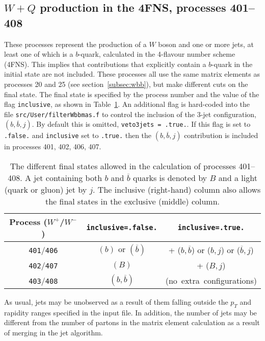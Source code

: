 \documentclass[12pt]{article}
\begin{document}
\subsection{$W+Q$ production in the 4FNS, processes 401--408}
\label{subsec:wbbfilter}
These processes represent the production of a $W$ boson and one or more jets,
at least one of which is a $b$-quark, calculated in the 4-flavour number scheme (4FNS). 
This implies that contributions that explicitly contain a $b$-quark in the initial state
are not included.
These processes all use the same matrix
elements as processes 20 and 25 (see section~\ref{subsec:wbb}), but make different
cuts on the final state. The final state is specified by the process number and
the value of the flag {\tt inclusive}, as shown in Table~\ref{table:wbbfilter}.
An additional flag is hard-coded into the file {\tt src/User/filterWbbmas.f} to control
the inclusion of the 3-jet configuration, $(b,\overline b,j)$. By default this is
omitted, {\tt veto3jets = .true.}. If this flag is set to {\tt .false.} and
{\tt inclusive} set to {\tt .true.} then the $(b,\overline b,j)$ contribution
is included in processes 401, 402, 406, 407.

\begin{table}
\begin{center}
\begin{tabular}{|c|c|c|} \hline
 Process ($W^+$/$W^-$) & {\tt inclusive=.false.} & {\tt inclusive=.true.} \\
\hline
{\tt 401}/{\tt 406} & $(b)$ or $(\overline b)$ & + ($b,\overline b$) or ($b,j$) or ($\overline b,j$) \\
{\tt 402}/{\tt 407} & $(B)$ & + ($B,j$) \\
{\tt 403}/{\tt 408} & $(b,\overline b)$ & \mbox{(no extra configurations)} \\
\hline
\end{tabular}
\caption{The different final states allowed in the calculation of processes 401--408. A jet containing
both $b$ and $\overline b$ quarks is denoted by $B$ and a light (quark or gluon) jet by $j$. The inclusive
(right-hand) column also allows the final states in the exclusive (middle) column.}
\label{table:wbbfilter}
\end{center}
\end{table}

As usual, jets may be unobserved as a result of them falling outside the $p_T$
and rapidity ranges specified in the input file. In addition, the number of jets
may be different from the number of partons in the matrix element calculation as
a result of merging in the jet algorithm.
\end{document}
